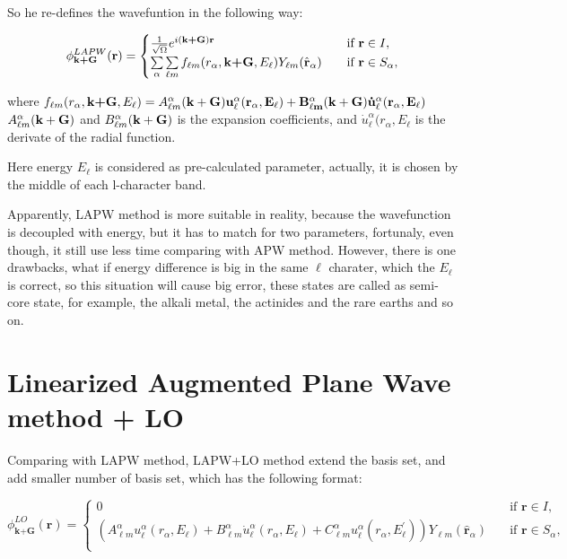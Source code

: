 \documentclass[a4paper]{report}
\begin{document}
\noindent So he re-defines the wavefuntion in the following way:

\begin{equation*}\label{lap1}
\phi^{LAPW}_\textbf{k+G} (\textbf{r})= 
\begin{cases} \frac {1}{\sqrt{\Omega}} e^{i(\textbf{k+G})\textbf{r}} & \quad \mbox{if $\textbf{r} \in I, $}
\\
\sumg<\alpha>\sum\limits_{{\ell}m} f_{{\ell}{m}} (r_{\alpha},\textbf{k+G}, E_{\ell}) Y_{{\ell}m}(\hat{\textbf{r}}_{\alpha})  & \quad \mbox{if $\textbf{r} \in S_\alpha, $}\\ 
\end{cases}
\end{equation*}

\noindent where $f_{{\ell}{m}} (r_{\alpha},\textbf{k+G} ,E_{\ell}) =  A _{{\ell}m}^{\alpha} \bf(k+G) u_{{\ell}}^{\alpha}(r_{\alpha}, E_{\ell}) + B _{{\ell}m}^{\alpha} \bf(k+G) \dot{u}_{{\ell}}^{\alpha}(r_{\alpha}, E_{\ell})$
$A _{{\ell}m}^{\alpha} \bf(k+G)$ and $B _{{\ell}m}^{\alpha} \bf(k+G)$ is the expansion coefficients, and $\dot{u}_{{\ell}}^{\alpha}(r_{\alpha}, E_{\ell}$ is the derivate of the radial function.

\noindent Here energy $E_{\ell}$  is considered as pre-calculated parameter, actually, it is chosen by the middle of  each l-character band.

\noindent Apparently, LAPW method is more suitable in reality, because the wavefunction is decoupled with energy, but it has to match for two parameters,
fortunaly, even though, it still use less time comparing with APW method. However, there is one drawbacks, what if energy difference is big in the same $ {\ell} $ charater, 
which the $E_{\ell}$ is correct, so this situation will cause big error, these states are called as semi-core state, for example, the alkali metal, the actinides and the rare earths and so on.

\section{Linearized Augmented Plane Wave method + LO}
Comparing with LAPW method, LAPW+LO method extend the basis set, and add smaller number of basis set, which has the following format:


\begin{equation*}\label{lap1}
\phi^{LO}_\textbf{k+G} (\textbf{r})= 
\begin{cases} 0 & \quad \mbox{if $\textbf{r} \in I, $}
\\
(A _{{\ell}m}^{\alpha}  u_{{\ell}}^{\alpha}(r_{\alpha}, E_{\ell}) + B _{{\ell}m}^{\alpha}  \dot{u}_{{\ell}}^{\alpha}(r_{\alpha}, E_{\ell}) + C _{{\ell}m}^{\alpha}  u_{{\ell}}^{\alpha}(r_{\alpha}, E^{\prime}_{\ell})){Y_{{\ell}m}(\hat{\textbf{r}}_{\alpha})} & \quad \mbox{if $\textbf{r} \in S_\alpha, $}\\ 
\end{cases}
\end{equation*}
 
\end{document}
